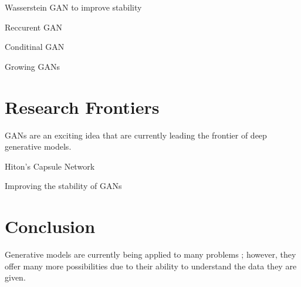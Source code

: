 \documentclass[11pt]{article}
\begin{document}
Wasserstein GAN to improve stability

Reccurent GAN

Conditinal GAN

Growing GANs

\section{Research Frontiers}
GANs are an exciting idea that are currently leading the frontier of deep generative models.

Hiton's Capsule Network

Improving the stability of GANs

\section{Conclusion}
Generative models are currently being applied to many problems \citep{genmodelingopenai}; however, they offer many more possibilities due to their ability to understand the data they are given.



\end{document}

